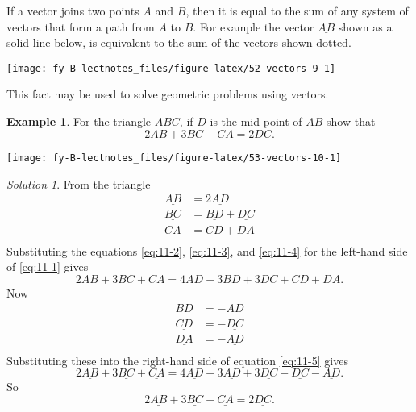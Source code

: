 \documentclass[
  english,
  11pt,
  oneside]{book}
\newcommand{\slide}{}
\theoremstyle{definition}
\theoremstyle{definition}
\newtheorem{example}{Example}[chapter]
\theoremstyle{definition}
\theoremstyle{definition}
\theoremstyle{remark}
\newtheorem*{solution}{Solution}
\begin{document}
\slide

If a vector joins two points \(A\) and \(B\), then it is equal to the sum of any system of vectors that form a path from \(A\) to \(B\). For example the vector \(\underline{AB}\) shown as a solid line below, is equivalent to the sum of the vectors shown dotted.

\begin{center}\texttt{[image: fy-B-lectnotes\_files/figure-latex/52-vectors-9-1]} \end{center}

This fact may be used to solve geometric problems using vectors.

\slide

\begin{example}

For the triangle \(ABC\), if \(D\) is the mid-point of \(AB\) show that
\begin{equation}
2\underline{AB}+3\underline{BC}+\underline{CA} = 2\underline{DC}.
\label{eq:11-1}
\end{equation}

\begin{center}\texttt{[image: fy-B-lectnotes\_files/figure-latex/53-vectors-10-1]} \end{center}

\end{example}

\begin{solution}
From the triangle
\begin{align}
\underline{AB}&=2\underline{AD}
\label{eq:11-2}\\
\underline{BC}&=\underline{BD}+\underline{DC}
\label{eq:11-3}\\
\underline{CA}&=\underline{CD}+\underline{DA}
\label{eq:11-4}\\
\end{align}
Substituting the equations \eqref{eq:11-2}, \eqref{eq:11-3}, and \eqref{eq:11-4} for the left-hand side of \eqref{eq:11-1} gives
\begin{equation}
2\underline{AB}+3\underline{BC}+\underline{CA}=4\underline{AD}+3\underline{BD}+3\underline{DC}+\underline{CD}+\underline{DA}.
\label{eq:11-5}
\end{equation}
Now
\begin{align*}
\underline{BD}&=-\underline{AD}\\
\underline{CD}&=-\underline{DC}\\
\underline{DA}&=-\underline{AD}\\
\end{align*}
Substituting these into the right-hand side of equation \eqref{eq:11-5} gives
\[
2\underline{AB}+3\underline{BC}+\underline{CA}=4\underline{AD}-3\underline{AD}+3\underline{DC}-\underline{DC}-\underline{AD}.
\]
So
\[
2\underline{AB}+3\underline{BC}+\underline{CA} = 2\underline{DC}.
\]
\end{solution}
\end{document}
